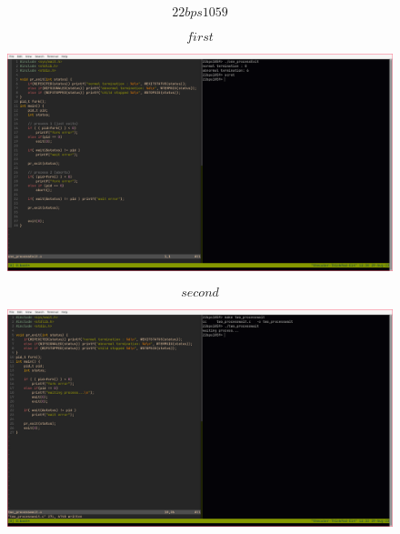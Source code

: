 \documentclass{article}
\begin{document}
$$22bps1059$$
\begin{figure}[htbp]
    $$first$$
   \centerline{ \includegraphics[width=1.5\linewidth]{fig1.png} }
    $$second$$
   \centerline{ \includegraphics[width=1.5\linewidth]{fig2.png} }
\end{figure}
\end{document}
